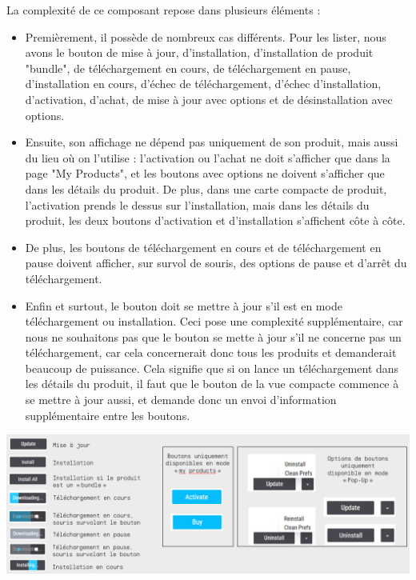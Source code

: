 \documentclass[francais]{rapportPFE}  %
\begin{document}
La complexité de ce composant repose dans plusieurs éléments :
\begin{itemize}
    \item Premièrement, il possède de nombreux cas différents. Pour les lister, nous avons le bouton de mise à jour, d'installation, d'installation de produit "bundle", de téléchargement en cours, de téléchargement en pause, d'installation en cours, d'échec de téléchargement, d'échec d'installation, d'activation, d'achat, de mise à jour avec options et de désinstallation avec options.
    \item Ensuite, son affichage ne dépend pas uniquement de son produit, mais aussi du lieu où on l'utilise : l'activation ou l'achat ne doit s'afficher que dans la page "My Products", et les boutons avec options ne doivent s'afficher que dans les détails du produit. De plus, dans une carte compacte de produit, l'activation prends le dessus sur l'installation, mais dans les détails du produit, les deux boutons d'activation et d'installation s'affichent côte à côte.
    \item De plus, les boutons de téléchargement en cours et de téléchargement en pause doivent afficher, sur survol de souris, des options de pause et d'arrêt du téléchargement.
    \item Enfin et surtout, le bouton doit se mettre à jour s'il est en mode téléchargement ou installation. Ceci pose une complexité supplémentaire, car nous ne souhaitons pas que le bouton se mette à jour s'il ne concerne pas un téléchargement, car cela concernerait donc tous les produits et demanderait beaucoup de puissance. Cela signifie que si on lance un téléchargement dans les détails du produit, il faut que le bouton de la vue compacte commence à se mettre à jour aussi, et demande donc un envoi d'information supplémentaire entre les boutons.
\end{itemize}

\begin{center}
    \centering
    \includegraphics[width=1\textwidth]{graphics/boutons.png}
    \label{fig:test1}
\end{center}
\end{document}
